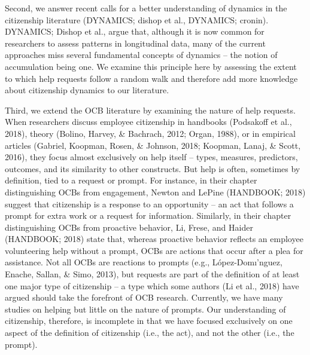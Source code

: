 \documentclass[english,,man]{apa6}
\theoremstyle{definition}
\theoremstyle{definition}
\theoremstyle{definition}
\theoremstyle{remark}
\begin{document}
Second, we answer recent calls for a better understanding of dynamics in
the citizenship literature (DYNAMICS; dishop et al., DYNAMICS; cronin).
DYNAMICS; Dishop et al., argue that, although it is now common for
researchers to assess patterns in longitudinal data, many of the current
approaches miss several fundamental concepts of dynamics -- the notion
of accumulation being one. We examine this principle here by assessing
the extent to which help requests follow a random walk and therefore add
more knowledge about citizenship dynamics to our literature.

Third, we extend the OCB literature by examining the nature of help
requests. When researchers discuss employee citizenship in handbooks
(Podsakoff et al., 2018), theory (Bolino, Harvey, \& Bachrach, 2012;
Organ, 1988), or in empirical articles (Gabriel, Koopman, Rosen, \&
Johnson, 2018; Koopman, Lanaj, \& Scott, 2016), they focus almost
exclusively on help itself -- types, measures, predictors, outcomes, and
its similarity to other constructs. But help is often, sometimes by
definition, tied to a request or prompt. For instance, in their chapter
distinguishing OCBs from engagement, Newton and LePine (HANDBOOK; 2018)
suggest that citizenship is a response to an opportunity -- an act that
follows a prompt for extra work or a request for information. Similarly,
in their chapter distinguishing OCBs from proactive behavior, Li, Frese,
and Haider (HANDBOOK; 2018) state that, whereas proactive behavior
reflects an employee volunteering help without a prompt, OCBs are
actions that occur after a plea for assistance. Not all OCBs are
reactions to prompts (e.g., López-Domı'nguez, Enache, Sallan, \& Simo,
2013), but requests are part of the definition of at least one major
type of citizenship -- a type which some authors (Li et al., 2018) have
argued should take the forefront of OCB research. Currently, we have
many studies on helping but little on the nature of prompts. Our
understanding of citizenship, therefore, is incomplete in that we have
focused exclusively on one aspect of the definition of citizenship
(i.e., the act), and not the other (i.e., the prompt).
\end{document}
